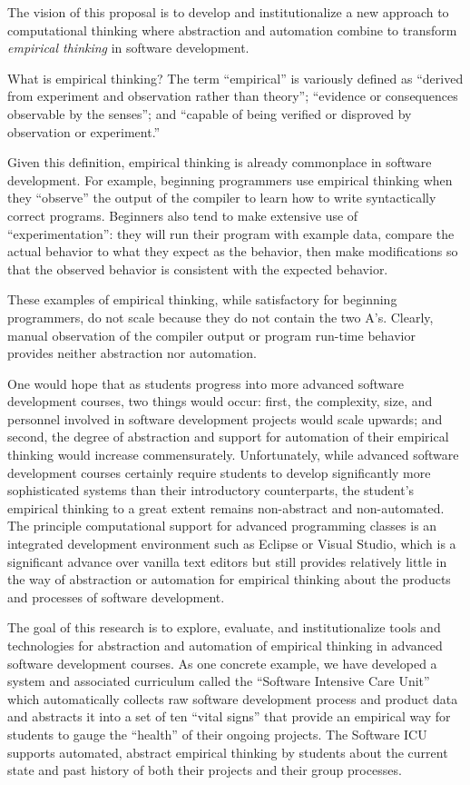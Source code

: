 The vision of this proposal is to develop and institutionalize a new
approach to computational thinking where abstraction and automation combine
to transform {\em empirical thinking} in software development.

What is empirical thinking?  The term ``empirical'' is variously defined as
``derived from experiment and observation rather than theory''; ``evidence
or consequences observable by the senses''; and ``capable of being verified
or disproved by observation or experiment.''

Given this definition, empirical thinking is already commonplace in
software development.  For example, beginning programmers use empirical
thinking when they ``observe'' the output of the compiler to learn how to
write syntactically correct programs.  Beginners also tend to make
extensive use of ``experimentation'': they will run their program with
example data, compare the actual behavior to what they expect as the
behavior, then make modifications so that the observed behavior is
consistent with the expected behavior.

These examples of empirical thinking, while satisfactory for beginning
programmers, do not scale because they do not contain the two A's.
Clearly, manual observation of the compiler output or program run-time
behavior provides neither abstraction nor automation.

One would hope that as students progress into more advanced software
development courses, two things would occur: first, the complexity, size,
and personnel involved in software development projects would scale
upwards; and second, the degree of abstraction and support for automation
of their empirical thinking would increase commensurately. Unfortunately,
while advanced software development courses certainly require students to
develop significantly more sophisticated systems than their introductory
counterparts, the student's empirical thinking to a great extent remains
non-abstract and non-automated.  The principle computational support for
advanced programming classes is an integrated development environment such
as Eclipse or Visual Studio, which is a significant advance over vanilla
text editors but still provides relatively little in the way of abstraction
or automation for empirical thinking about the products and processes of
software development.

The goal of this research is to explore, evaluate, and institutionalize
tools and technologies for abstraction and automation of empirical thinking
in advanced software development courses.  As one concrete example, we have
developed a system and associated curriculum called the ``Software
Intensive Care Unit'' which automatically collects raw software development
process and product data and abstracts it into a set of ten ``vital signs''
that provide an empirical way for students to gauge the ``health'' of their
ongoing projects.  The Software ICU supports automated, abstract empirical
thinking by students about the current state and past history of both their
projects and their group processes.

